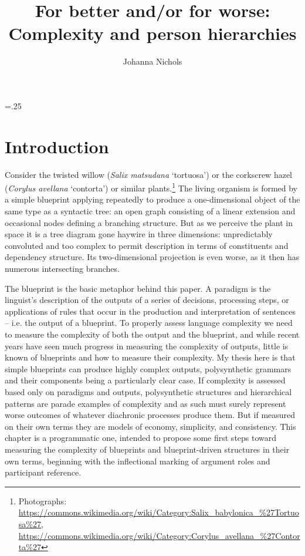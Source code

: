 \documentclass[output=paper,hidelinks]{langscibook}
\author{Johanna Nichols\affiliation{University of California, Berkeley;University of Helsinki\\;Higher School of Economics, Moscow}}
\title{For better and/or for worse: Complexity and person hierarchies}
\begin{document}
\multicolsep=.25\baselineskip
\maketitle

\section{Introduction}
Consider the twisted willow (\textit{Salix matsudana} ‘tortuosa’) or the corkscrew hazel (\textit{Corylus avellana} ‘contorta’) or similar plants.\footnote{Photographs:\\
\url{https://commons.wikimedia.org/wiki/Category:Salix_babylonica_\%27Tortuosa\%27},
\url{https://commons.wikimedia.org/wiki/Category:Corylus_avellana_\%27Contorta\%27}
}
The living organism is formed by a simple blueprint applying repeatedly to produce a one-dimensional object of the same type as a syntactic tree: an open graph consisting of a linear extension and occasional nodes defining a branching structure.  But as we perceive the plant in space it is a tree diagram gone haywire in three dimensions: unpredictably convoluted and too complex to permit description in terms of constituents and dependency structure.  Its two-dimensional projection is even worse, as it then has numerous intersecting branches.

The blueprint is the basic metaphor behind this paper.  A paradigm is the linguist's description of the outputs of a series of decisions, processing steps, or applications of rules that occur in the production and interpretation of sentences -- i.e. the output of a blueprint. To properly assess language complexity we need to measure the complexity of both the output and the blueprint, and while recent years have seen much progress in measuring the complexity of outputs, little is known of blueprints and how to measure their complexity.  My thesis here is that simple blueprints can produce highly complex outputs, polysynthetic grammars and their components being a particularly clear case.  If complexity is assessed based only on paradigms and outputs, polysynthetic structures and hierarchical patterns are parade examples of complexity and as such must surely represent worse outcomes of whatever diachronic processes produce them.  But if measured on their own terms they are models of economy, simplicity, and consistency.  This chapter is a programmatic one, intended to propose some first steps toward measuring the complexity of blueprints and blueprint-driven structures in their own terms, beginning with the inflectional marking of argument roles and participant reference.
\end{document}
